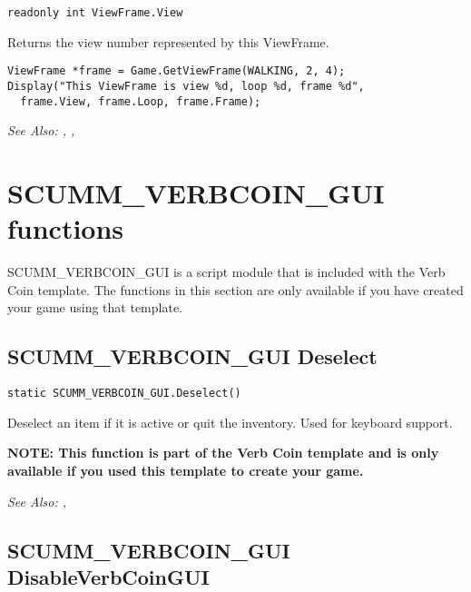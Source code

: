 \begin{verbatim}
readonly int ViewFrame.View
\end{verbatim}
Returns the view number represented by this ViewFrame.

\begin{verbatim}
ViewFrame *frame = Game.GetViewFrame(WALKING, 2, 4);
Display("This ViewFrame is view %d, loop %d, frame %d",
  frame.View, frame.Loop, frame.Frame);
\end{verbatim}

\it{See Also:} ,
,



\section{SCUMM_VERBCOIN_GUI functions}

SCUMM_VERBCOIN_GUI is a script module that is included with the Verb Coin template.
The functions in this section are only available if you have created your game
using that template.




\subsection{SCUMM_VERBCOIN_GUI Deselect}\label{SCUMM_VERBCOIN_GUI.Deselect}%

\begin{verbatim}
static SCUMM_VERBCOIN_GUI.Deselect()
\end{verbatim}
Deselect an item if it is active or quit the inventory. Used for keyboard support.

\bf{NOTE:} This function is part of the Verb Coin template and is only available if
you used this template to create your game.

\it{See Also:} ,


\subsection{SCUMM_VERBCOIN_GUI DisableVerbCoinGUI}\label{SCUMM_VERBCOIN_GUI.DisableVerbCoinGUI}%

